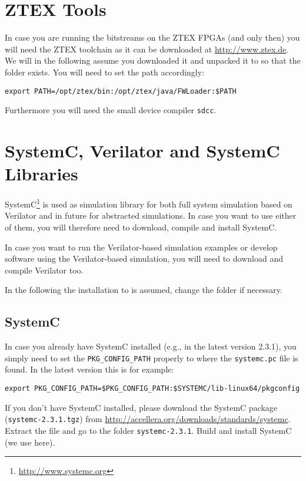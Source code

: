 \section{ZTEX Tools}

In case you are running the bitstreams on the ZTEX FPGAs (and only
then) you will need the ZTEX toolchain as it can be downloaded at
\url{http://www.ztex.de}. We will in the following assume you
downloaded it and unpacked it to  so that the folder
 exists. You will need to set the path
accordingly:

\begin{lstlisting}
export PATH=/opt/ztex/bin:/opt/ztex/java/FWLoader:$PATH
\end{lstlisting}

Furthermore you will need the small device compiler \verb|sdcc|.

\section{SystemC, Verilator and SystemC Libraries}

SystemC\footnote{\url{http://www.systemc.org}} is used as simulation
library for both full system simulation based on Verilator and in
future for abstracted simulations. In case you want to use either of
them, you will therefore need to download, compile and install
SystemC.

In case you want to run the Verilator-based simulation examples or
develop software using the Verilator-based simulation, you will need
to download and compile Verilator too.

In the following the installation to  is assumed, change
the folder if necessary.

\subsection{SystemC}

In case you already have SystemC installed (e.g., in the latest
version 2.3.1), you simply need to set the \verb|PKG_CONFIG_PATH|
properly to where the \verb|systemc.pc| file is found. In the latest
version this is for example:

\begin{lstlisting}
export PKG_CONFIG_PATH=$PKG_CONFIG_PATH:$SYSTEMC/lib-linux64/pkgconfig
\end{lstlisting}

If you don't have SystemC installed, please download the SystemC
package (\verb|systemc-2.3.1.tgz|) from
\url{http://accellera.org/downloads/standards/systemc}. Extract the
file and go to the folder \texttt{systemc-2.3.1}. Build and install
SystemC (we use  here).


